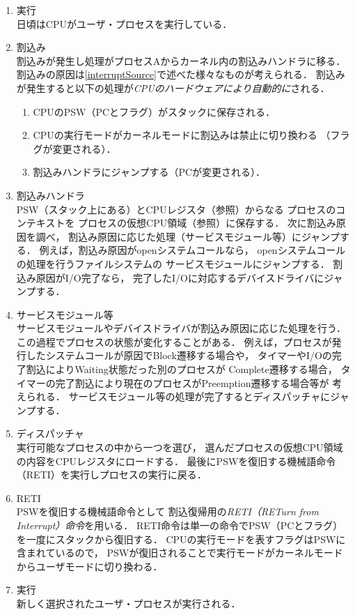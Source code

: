 \begin{enumerate}
\item 実行 \\
  日頃はCPUがユーザ・プロセスを実行している．
\item 割込み \\
  割込みが発生し処理がプロセスAからカーネル内の割込みハンドラに移る．
  割込みの原因は\ref{interruptSource}で述べた様々なものが考えられる．
  割込みが発生すると以下の処理が\emph{CPUのハードウェアにより自動的に}される．
  \begin{enumerate}
  \item CPUのPSW（PCとフラグ）がスタックに保存される．
  \item CPUの実行モードがカーネルモードに割込みは禁止に切り換わる
  （フラグが変更される）．
  \item 割込みハンドラにジャンプする（PCが変更される）．
  \end{enumerate}
\item 割込みハンドラ \\
  PSW（スタック上にある）とCPUレジスタ（参照）からなる
  プロセスのコンテキストを
  プロセスの仮想CPU領域（参照）に保存する．
  次に割込み原因を調べ，
  割込み原因に応じた処理（サービスモジュール等）にジャンプする．
  例えば，割込み原因がopenシステムコールなら，
  openシステムコールの処理を行うファイルシステムの
  サービスモジュールにジャンプする．
  割込み原因がI/O完了なら，
  完了したI/Oに対応するデバイスドライバにジャンプする．
\item サービスモジュール等 \\
  サービスモジュールやデバイスドライバが割込み原因に応じた処理を行う．
  この過程でプロセスの状態が変化することがある．
  例えば，プロセスが発行したシステムコールが原因でBlock遷移する場合や，
  タイマーやI/Oの完了割込によりWaiting状態だった別のプロセスが
  Complete遷移する場合，
  タイマーの完了割込により現在のプロセスがPreemption遷移する場合等が
  考えられる．
  サービスモジュール等の処理が完了するとディスパッチャにジャンプする．
\item ディスパッチャ \\
  実行可能なプロセスの中から一つを選び，
  選んだプロセスの仮想CPU領域の内容をCPUレジスタにロードする．
  最後にPSWを復旧する機械語命令（RETI）を実行しプロセスの実行に戻る．
\item RETI \\
  PSWを復旧する機械語命令として
  割込復帰用の\emph{RETI（RETurn from Interrupt）命令}を用いる．
  RETI命令は単一の命令でPSW（PCとフラグ）を一度にスタックから復旧する．
  CPUの実行モードを表すフラグはPSWに含まれているので，
  PSWが復旧されることで実行モードがカーネルモードからユーザモードに切り換わる．
\item 実行 \\
  新しく選択されたユーザ・プロセスが実行される．
\end{enumerate}

